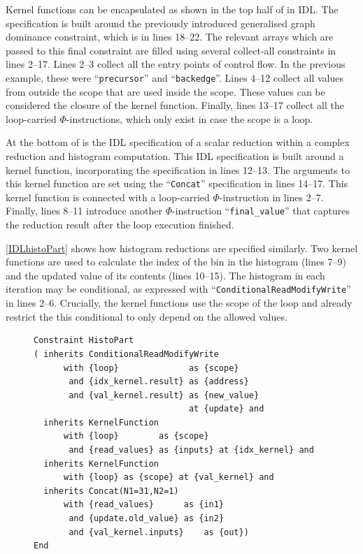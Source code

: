     Kernel functions can be encapsulated as shown in the top half of
     in IDL.
    The specification is built around the previously introduced generalised
    graph dominance constraint, which is in lines 18--22.
    The relevant arrays which are passed to this final constraint are filled
    using several collect-all constraints in lines 2--17.
    Lines 2--3 collect all the entry points of control flow.
    In the previous example, these were ``{\tt precursor}'' and
    ``{\tt backedge}''.
    Lines 4--12 collect all values from outside the scope that are used inside
    the scope.
    These values can be considered the closure of the kernel function.
    Finally, lines 13--17 collect all the loop-carried $\Phi$-instructions,
    which only exist in case the scope is a loop.

    At the bottom of  is the IDL specification of a
    scalar reduction within a complex reduction and histogram computation.
    This IDL specification is built around a kernel function, incorporating the
    specification in lines 12--13.
    The arguments to this kernel function are set using the ``{\tt Concat}''
    specification in lines 14--17.
    This kernel function is connected with a loop-carried $\Phi$-instruction in
    lines 2--7.
    Finally, lines 8--11 introduce another $\Phi$-instruction
    ``{\tt final\_value}'' that captures the reduction result after the loop
    execution finished.

    \autoref{IDLhistoPart} shows how histogram reductions are specified
    similarly.
    Two kernel functions are used to calculate the index of the bin in
    the histogram (lines 7--9) and the updated value of its contents
    (lines 10--15).
    The histogram in each iteration may be conditional, as expressed with
    ``{\tt ConditionalReadModifyWrite}'' in lines 2--6.
    Crucially, the kernel functions use the scope of the loop and already
    restrict the this conditional to only depend on the allowed values.

\begin{figure}[H]
\begin{lstlisting}[language=IDL,label={IDLhistoPart},caption=
   {IDL specification of a histogram reduction within a complex reduction and
    histogram computation:
    Two kernel functions are present: lines 7--9 calculate the index into the
    histogram array, lines 10--11 generate the updated value.
    The read-modify-write step may be conditional.
    \parfillskip=0pt}]
Constraint HistoPart
( inherits ConditionalReadModifyWrite
      with {loop}              as {scope}
       and {idx_kernel.result} as {address}
       and {val_kernel.result} as {new_value}
                               at {update} and
  inherits KernelFunction
      with {loop}        as {scope}
       and {read_values} as {inputs} at {idx_kernel} and
  inherits KernelFunction
      with {loop} as {scope} at {val_kernel} and
  inherits Concat(N1=31,N2=1)
      with {read_values}      as {in1}
       and {update.old_value} as {in2}
       and {val_kernel.inputs}    as {out})
End
\end{lstlisting}
\end{figure}

